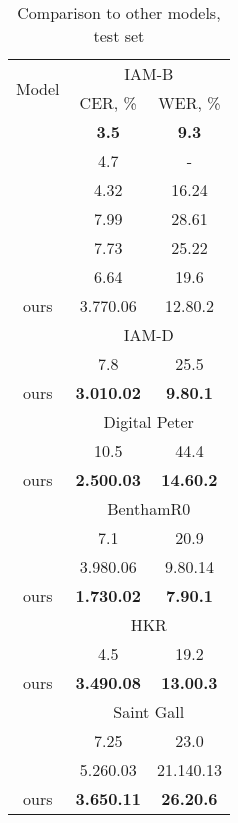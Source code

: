 \documentclass[10pt,twocolumn,letterpaper]{article}
\begin{document}
\begin{table}[ht]
\begin{center}
\begin{tabular}{|c|c|c|}
\hline
\multirow{2}{*}{Model} & \multicolumn{2}{c|}{IAM-B}\\
\cline{2-3}
& CER, \% & WER, \% \\
\hline
\cite{voigtlaender2016handwriting} & \textbf{3.5} & \textbf{9.3} \\
\cite{yousef2020origaminet} & 4.7 & - \\
\cite{coquenet2020end} & 4.32 & 16.24 \\
\cite{coquenet2020recurrence} & 7.99 & 28.61\\
\cite{moysset20192d} & 7.73 & 25.22\\
\cite{wang2020decoupled} & 6.64 & 19.6\\
ours & 3.770.06  & 12.80.2\\
\hline
\hline
\multirow{2}{*}{} & \multicolumn{2}{c|}{IAM-D}\\
\cline{2-3}
\cite{abdallah2020attention}&7.8 & 25.5\\
ours & \textbf{3.010.02}  & \textbf{9.80.1}\\
\hline
\hline
\multirow{2}{*}{}& \multicolumn{2}{c|}{Digital Peter}\\
\cline{2-3}
\cite{complink}&10.5 & 44.4\\
ours & \textbf{2.500.03}  & \textbf{14.60.2}\\
\hline
\hline
\multirow{2}{*}{} & \multicolumn{2}{c|}{BenthamR0}\\
\cline{2-3}
\cite{abdallah2020attention} & 7.1 & 20.9 \\
\cite{de2020htr}& 3.980.06  & 9.80.14\\
ours & \textbf{1.730.02}  & \textbf{7.90.1}\\
\hline
\hline
\multirow{2}{*}{} & \multicolumn{2}{c|}{HKR}\\
\cline{2-3}
\cite{abdallah2020attention} & 4.5 & 19.2\\
ours & \textbf{3.490.08}  & \textbf{13.00.3}\\
\hline
\hline
\multirow{2}{*}{}& \multicolumn{2}{c|}{Saint Gall}\\
\cline{2-3}
\cite{abdallah2020attention} & 7.25 & 23.0\\
\cite{de2020htr}  & 5.260.03 & 21.140.13 \\
ours & \textbf{3.650.11}  & \textbf{26.20.6} \\
\hline
\end{tabular}
\end{center}
\caption{\label{tab:hwb-result-comparison} Comparison to other models, test set}
\end{table}
\end{document}
